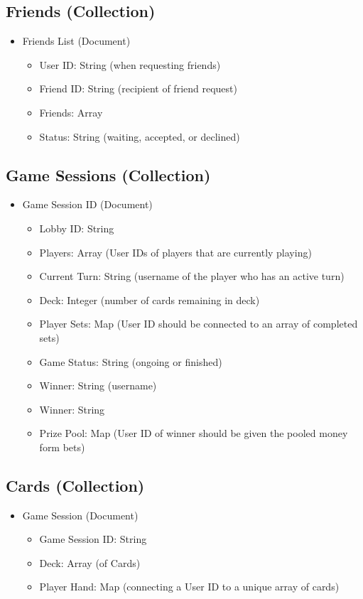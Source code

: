 \subsection{Friends (Collection)}
\begin{itemize}
    \item Friends List (Document)
    \begin{itemize}
        \item User ID: String (when requesting friends)
        \item Friend ID: String (recipient of friend request)
        \item Friends: Array
        \item Status: String (waiting, accepted, or declined)
    \end{itemize}
\end{itemize}

\subsection{Game Sessions (Collection)}
\begin{itemize}
    \item Game Session ID (Document)
    \begin{itemize}
        \item Lobby ID: String
        \item Players: Array (User IDs of players that are currently playing)
        \item Current Turn: String (username of the player who has an active turn)
        \item Deck: Integer (number of cards remaining in deck)
        \item Player Sets: Map (User ID should be connected to an array of completed sets)
        \item Game Status: String (ongoing or finished)
        \item Winner: String (username)
        \item Winner: String
        \item Prize Pool: Map (User ID of winner should be given the pooled money form bets)
    \end{itemize}
\end{itemize}

\subsection{Cards (Collection)}
\begin{itemize}
    \item Game Session (Document)
    \begin{itemize}
        \item Game Session ID: String
        \item Deck: Array (of Cards)
        \item Player Hand: Map (connecting a User ID to a unique array of cards)
    \end{itemize}
\end{itemize}

